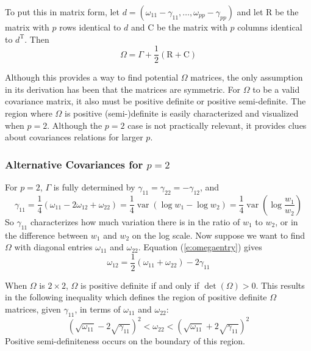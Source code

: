 \documentclass[10pt]{article}
\newcommand{\var}{\operatorname{var}}
\begin{document}
To put this in matrix form, let $d = (\omega_{11} - \gamma_{11}, \dots, \omega_{pp} - \gamma_{pp})$ and let $\mathrm{R}$ be the matrix with $p$ rows identical to $d$ and $\mathrm{C}$ be the matrix with $p$ columns identical to $d^\mathrm{T}$. Then
\begin{equation}
\label{e:omegamatrix}
\Omega = \Gamma + \frac{1}{2}(\mathrm{R} + \mathrm{C})
\end{equation}

Although this provides a way to find potential $\Omega$ matrices, the only assumption in its derivation has been that the matrices are symmetric. For $\Omega$ to be a valid covariance matrix, it also must be positive definite or positive semi-definite. The region where $\Omega$ is positive (semi-)definite is easily characterized and visualized when $p = 2$. Although the $p = 2$ case is not practically relevant, it provides clues about covariances relations for larger $p$.

\subsubsection*{Alternative Covariances for $p=2$}

For $p = 2$, $\Gamma$ is fully determined by $\gamma_{11} = \gamma_{22} = -\gamma_{12}$, and
\begin{equation}
\gamma_{11} = \frac{1}{4}(\omega_{11} - 2\omega_{12} + \omega_{22}) = \frac{1}{4}\var(\log w_1 - \log w_2) = \frac{1}{4} \var\left( \log \frac{w_1}{w_2} \right)
\end{equation}
So $\gamma_{11}$ characterizes how much variation there is in the ratio of $w_1$ to $w_2$, or in the difference between $w_1$ and $w_2$ on the log scale. Now suppose we want to find $\Omega$ with diagonal entries $\omega_{11}$ and $\omega_{22}$. Equation (\ref{e:omegaentry}) gives
\begin{equation}
\label{e:sig12}
\omega_{12} = \frac{1}{2}(\omega_{11} + \omega_{22}) - 2\gamma_{11}
\end{equation}

When $\Omega$ is $2 \times 2$, $\Omega$ is positive definite if and only if $\det(\Omega) > 0$. This results in the following inequality which defines the region of positive definite $\Omega$ matrices, given $\gamma_{11}$, in terms of $\omega_{11}$ and $\omega_{22}$:
\begin{equation}
\left( \sqrt{\omega_{11}} - 2\sqrt{\gamma_{11}} \right)^2 < \omega_{22} < \left( \sqrt{\omega_{11}} + 2\sqrt{\gamma_{11}} \right)^2
\end{equation}
Positive semi-definiteness occurs on the boundary of this region.
\end{document}
